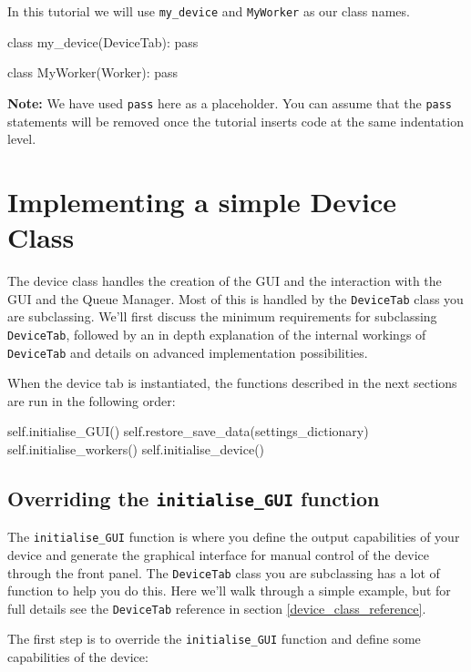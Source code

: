 \documentclass[12pt]{article}
\begin{document}
In this tutorial we will use \texttt{my\_device} and \texttt{MyWorker} as our class names. 

\begin{python}
class my_device(DeviceTab):
    pass
	
class MyWorker(Worker):
    pass
\end{python}

\textbf{Note:} We have used \texttt{pass} here as a placeholder. 
You can assume that the \texttt{pass} statements will be removed once the tutorial inserts code at the same indentation level.


\section{Implementing a simple Device Class}\label{device_class}
The device class handles the creation of the GUI and the interaction with the GUI and the Queue Manager. 
Most of this is handled by the \texttt{DeviceTab} class you are subclassing.
We'll first discuss the minimum requirements for subclassing \texttt{DeviceTab}, followed by an in depth explanation of the internal workings of \texttt{DeviceTab} and details on advanced implementation possibilities.

When the device tab is instantiated, the functions described in the next sections are run in the following order:
\begin{python}
    self.initialise_GUI() 
    self.restore_save_data(settings_dictionary)
    self.initialise_workers()
    self.initialise_device()
\end{python}

\subsection{Overriding the \texttt{initialise\_GUI} function}
The \texttt{initialise\_GUI} function is where you define the output capabilities of your device and generate the graphical interface for manual control of the device through the front panel.
The \texttt{DeviceTab} class you are subclassing has a lot of function to help you do this.
Here we'll walk through a simple example, but for full details see the \texttt{DeviceTab} reference in section \ref{device_class_reference}.

The first step is to override the \texttt{initialise\_GUI} function and define some capabilities of the device:
\end{document}
